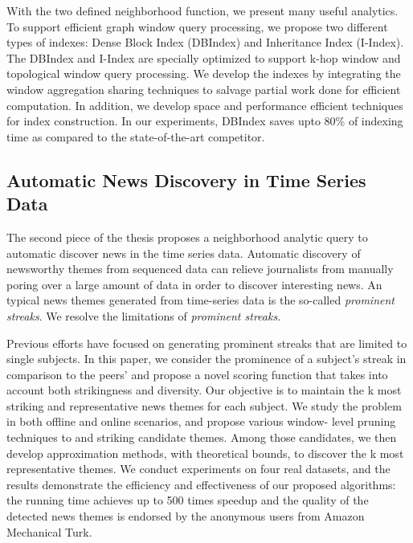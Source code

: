 With the two defined neighborhood function, we present many useful analytics. To support efficient graph window query processing, we propose
two different types of indexes: Dense Block Index (DBIndex)
and Inheritance Index (I-Index). The DBIndex and I-Index
are specially optimized to support k-hop window and topological
window query processing. We develop the indexes
by integrating the window aggregation sharing techniques
to salvage partial work done for efficient computation. 
In addition, we develop space and performance efficient techniques
for index construction. In our experiments, DBIndex saves upto 80\%
of indexing time as compared to the state-of-the-art competitor.


\subsection{Automatic News Discovery in Time Series Data}
The second piece of the thesis proposes a neighborhood analytic
query to automatic discover news in the time series data.
Automatic discovery of newsworthy themes from sequenced
data can relieve journalists from manually poring over a
large amount of data in order to discover interesting news.
An typical news themes generated from time-series data
is the so-called \emph{prominent streaks}. We resolve the limitations
of \emph{prominent streaks}.

Previous efforts have focused on generating prominent streaks
that are limited to single subjects. In this paper, we consider 
the prominence of a subject's streak in comparison to
the peers' and propose a novel scoring function that takes
into account both strikingness and diversity. Our objective
is to maintain the k most striking and representative news
themes for each subject. We study the problem in both
offline and online scenarios, and propose various window-
level pruning techniques to and striking candidate themes.
Among those candidates, we then develop approximation
methods, with theoretical bounds, to discover the k most
representative themes. We conduct experiments on four real
datasets, and the results demonstrate the efficiency and 
effectiveness of our proposed algorithms: the running time
achieves up to 500 times speedup and the quality of the
detected news themes is endorsed by the anonymous users
from Amazon Mechanical Turk.

